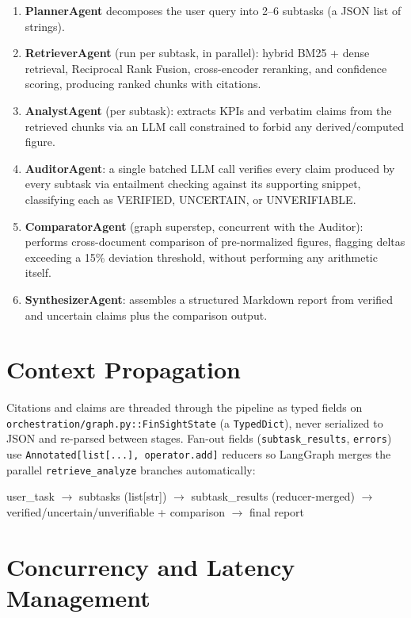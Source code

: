 \documentclass[11pt,a4paper]{report}
\newcommand{\code}[1]{\texttt{#1}}
\begin{document}
\begin{enumerate}[leftmargin=1.5em]
    \item \textbf{PlannerAgent} decomposes the user query into 2--6 subtasks (a JSON
    list of strings).
    \item \textbf{RetrieverAgent} (run per subtask, in parallel): hybrid BM25 + dense
    retrieval, Reciprocal Rank Fusion, cross-encoder reranking, and confidence scoring,
    producing ranked chunks with citations.
    \item \textbf{AnalystAgent} (per subtask): extracts KPIs and verbatim claims from
    the retrieved chunks via an LLM call constrained to forbid any derived/computed
    figure.
    \item \textbf{AuditorAgent}: a single batched LLM call verifies every claim
    produced by every subtask via entailment checking against its supporting snippet,
    classifying each as VERIFIED, UNCERTAIN, or UNVERIFIABLE.
    \item \textbf{ComparatorAgent} (graph superstep, concurrent with the Auditor): performs
    cross-document comparison of pre-normalized figures, flagging deltas exceeding a
    15\% deviation threshold, without performing any arithmetic itself.
    \item \textbf{SynthesizerAgent}: assembles a structured Markdown report from
    verified and uncertain claims plus the comparison output.
\end{enumerate}

\section{Context Propagation}

Citations and claims are threaded through the pipeline as typed fields on
\code{orchestration/graph.py}\code{::FinSightState} (a \code{TypedDict}), never
serialized to JSON and re-parsed between stages. Fan-out fields
(\code{subtask\_results}, \code{errors}) use \code{Annotated[list[...],
operator.add]} reducers so LangGraph merges the parallel \code{retrieve\_analyze}
branches automatically:

\begin{center}
\ttfamily\small
user\_task $\rightarrow$ subtasks (list[str]) $\rightarrow$ subtask\_results
(reducer-merged) $\rightarrow$ verified/uncertain/unverifiable + comparison
$\rightarrow$ final report
\end{center}

\section{Concurrency and Latency Management}
\end{document}
